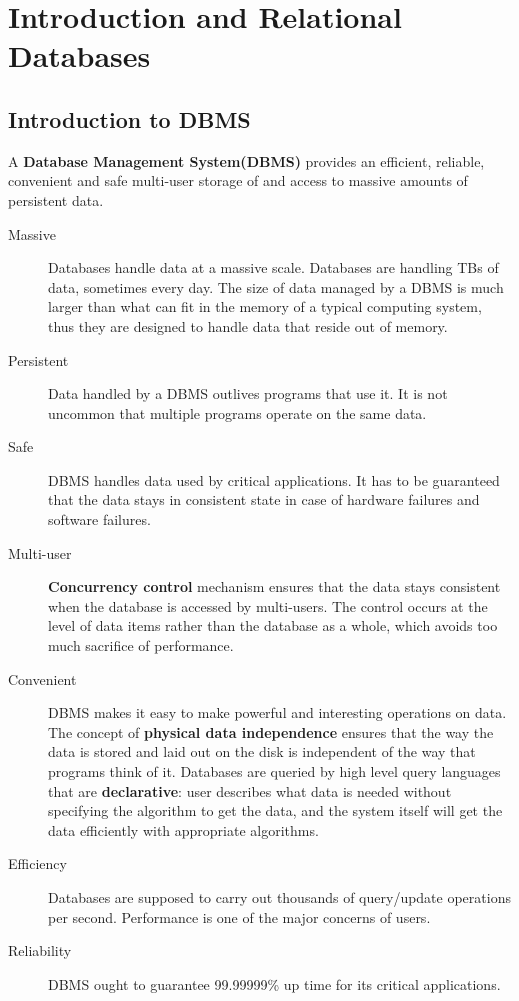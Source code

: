 \ifx\PREAMBLE\undefined


\fi
\chapter{Introduction and Relational Databases}
\section{Introduction to DBMS}
A \textbf{Database Management System(DBMS)} provides an efficient, reliable, convenient and safe multi-user storage of and access to massive amounts of persistent data. 
\begin{description}
\item[Massive]Databases handle data at a massive scale. Databases are handling TBs of data, sometimes every day. The size of data managed by a DBMS is much larger than what can fit in the memory of a typical computing system, thus they are designed to handle data that reside out of memory.
\item[Persistent]Data handled by a DBMS outlives programs that use it. It is not uncommon that multiple programs operate on the same data.
\item[Safe]DBMS handles data used by critical applications. It has to be guaranteed that the data stays in consistent state in case of hardware failures and software failures.
\item[Multi-user]\textbf{Concurrency control} mechanism ensures that the data stays consistent when the database is accessed by multi-users. The control occurs at the level of data items rather than the database as a whole, which avoids too much sacrifice of performance.
\item[Convenient]DBMS makes it easy to make powerful and interesting operations on data. The concept of \textbf{physical data independence} ensures that the way the data is stored and laid out on the disk is independent of the way that programs think of it. Databases are queried by high level query languages that are \textbf{declarative}: user describes what data is needed without specifying the algorithm to get the data, and the system itself will get the data efficiently with appropriate algorithms.
\item[Efficiency]Databases are supposed to carry out thousands of query/update operations per second. Performance is one of the major concerns of users.
\item[Reliability]DBMS ought to guarantee 99.99999\% up time for its critical applications. 
\end{description}
